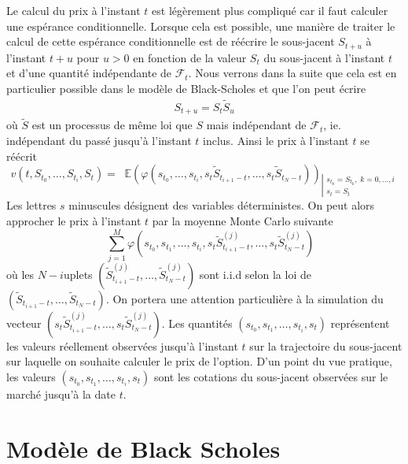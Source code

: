 \documentclass[a4paper,11pt]{article}
\def\cf{{\mathcal F}}
\def\E{{\mathbb E}}
\def\inv#1{\mathop{\frac{1}{ #1}}\nolimits}
\def\expp#1{\mathop {\mathrm{e}^{ #1}}}
\begin{document}
Le calcul du prix à l'instant $t$ est légèrement plus compliqué car il faut calculer une espérance conditionnelle. Lorsque cela est possible, une manière de traiter le calcul de cette espérance conditionnelle est de réécrire le sous-jacent $S_{t+u}$ à l'instant $t+u$ pour $u>0$ en fonction de la valeur $S_t$ du sous-jacent à l'instant $t$ et d'une quantité indépendante de $\cf_t$. Nous verrons dans la suite que cela est en particulier possible dans le modèle de Black-Scholes et que l'on peut écrire
\begin{align*}
  S_{t+u} = S_t \tilde S_u
\end{align*}
où $\tilde S$ est un processus de même loi que $S$ mais indépendant de $\cf_t$, ie. indépendant du passé jusqu'à l'instant $t$ inclus.  Ainsi le prix à l'instant $t$ se réécrit
\begin{equation*}
  v(t, S_{t_0}, \dots, S_{t_i}, S_t) = \expp{-r (T - t)} \E(\varphi(s_{t_0}, \dots,
  s_{t_i}, s_t \tilde S_{t_{i+1} - t}, \dots,  s_t \tilde S_{t_N - t}))_{\left|
  \begin{array}{l}
    s_{t_k} = S_{t_k}, \; k=0,\dots,i \\
    s_t = S_t
  \end{array}\right.}
\end{equation*}
Les lettres $s$ minuscules désignent des variables déterministes.  On peut alors approcher le prix à l'instant $t$ par la moyenne Monte Carlo
suivante
\begin{equation}
  \label{MC_t}
  \expp{-r (T - t)} \inv{M} \sum_{j=1}^M \varphi(s_{t_0}, s_{t_1}, \dots,
  s_{t_i}, s_t \tilde S_{t_{i+1} - t}^{(j)}, \dots,  s_t \tilde S_{t_N - t}^{(j)})
\end{equation}
où les $N-i$uplets $(\tilde S_{t_{i+1} - t}^{(j)}, \dots, \tilde S_{t_N - t}^{(j)})$ sont i.i.d selon la loi de $(\tilde S_{t_{i+1} - t}, \dots, \tilde S_{t_N - t})$. On portera une attention particulière à la simulation du vecteur $(s_t \tilde S_{t_{i+1} - t}^{(j)}, \dots,  s_t \tilde S_{t_N - t}^{(j)})$. Les quantités $(s_{t_0}, s_{t_1}, \dots, s_{t_i}, s_t)$ représentent les valeurs réellement observées jusqu'à l'instant $t$ sur la trajectoire du sous-jacent sur laquelle on souhaite calculer le prix de l'option. D'un point du vue pratique, les valeurs $(s_{t_0}, s_{t_1}, \dots, s_{t_i}, s_t)$ sont les cotations du sous-jacent observées sur le marché jusqu'à la date $t$.


\section{Modèle de Black Scholes}
\label{sec:modele}
\end{document}
